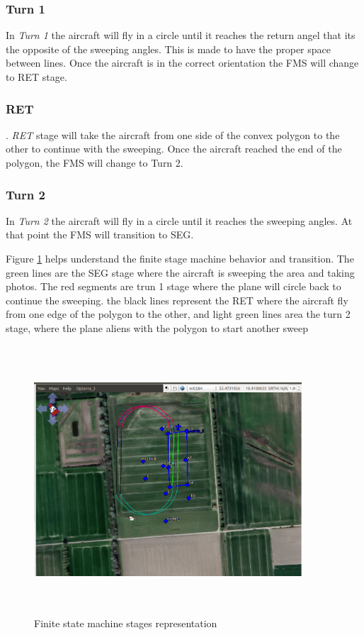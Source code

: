 \subsubsection{Turn 1}
In \textit{Turn 1} the aircraft will fly in a circle until it reaches the return angel that its the opposite of the sweeping angles. This is made to have the proper space between lines. Once the aircraft is in the correct orientation the FMS will change to RET stage.
\subsubsection{RET}.
\textit{RET} stage will take the aircraft from one side of the convex polygon to the other to continue with the sweeping. Once the aircraft reached the end of the polygon, the FMS will change to Turn 2.
\subsubsection{Turn 2}
In \textit{Turn 2} the aircraft will fly in a circle until it reaches the  sweeping angles. At that point the FMS will transition to SEG.

Figure \ref{fig:FMS_example} helps understand the finite stage machine behavior and transition.  The green lines are the SEG stage where the aircraft is sweeping the area and taking photos.  The red segments are trun 1 stage where the plane will circle back to continue the sweeping. the black lines represent the RET where the aircraft fly from one edge of the polygon to the other, and light green lines area the turn 2 stage, where the plane aliens with the polygon to start another sweep 
\begin{figure}[H]
\centering
\includegraphics[width=10cm,height=10cm,keepaspectratio]{imagenes/FMS_example.png}
\caption{Finite state machine stages representation}
\label{fig:FMS_example}
\end{figure}

